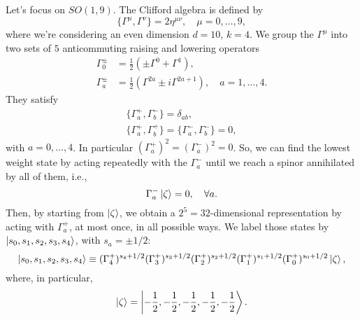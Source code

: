 \begin{mdframed}
Let's focus on $SO(1,9)$. The Clifford algebra is defined by
\begin{equation}\label{eq:clifford}
    \{ \Gamma^\mu, \Gamma^\nu \} = 2 \eta^{\mu\nu} , \quad \mu = 0, \dots, 9,
\end{equation}
where we're considering an even dimension $d = 10$, $k=4$. We group the $\Gamma^\mu$ into two sets of $5$ anticommuting raising and lowering operators
\begin{subequations}
\begin{align}
    \Gamma^\pm_0 &= \frac{1}{2} (\pm \Gamma^0 + \Gamma^1), \label{eq:gamma-zero-pm}\\
    \Gamma^\pm_a &= \frac{1}{2}(\Gamma^{2a} \pm i \Gamma^{2a+1}), \quad a = 1, \dots, 4 .\label{eq:gamma-a-pm}
\end{align}
\end{subequations}
They satisfy
\begin{subequations}\label{eq:md-anticomm}
\begin{gather}
    \{ \Gamma^+_a, \Gamma^-_b \} = \delta_{ab} , \\
    \{ \Gamma^+_a, \Gamma^+_b \} = \{ \Gamma^-_a, \Gamma^-_b \} = 0 ,
\end{gather}
\end{subequations}
with $a = 0, \dots, 4$. In particular $(\Gamma^+_a)^2=(\Gamma^-_a)^2=0$. So, we can find the lowest weight state by acting repeatedly with the $\Gamma^-_a$ until we reach a spinor annihilated by all of them, i.e.,
\begin{equation}
    \Gamma^-_a \ket{\zeta} = 0, \quad \forall a .
\end{equation}
Then, by starting from $\ket{\zeta}$, we obtain a $2^5 = 32$-dimensional representation by acting with $\Gamma^+_a$, at most once, in all possible ways. We label those states by $\ket{s_0,s_1,s_2,s_3,s_4}$, with $s_a = \pm 1/2$:
\begin{equation*}
    \ket{s_0,s_1,s_2,s_3,s_4} \equiv (\Gamma^+_4)^{s_4 + 1/2} (\Gamma^+_3)^{s_3 + 1/2} (\Gamma^+_2)^{s_2 + 1/2} (\Gamma^+_1)^{s_1 + 1/2} (\Gamma^+_0)^{s_0 + 1/2} \ket{\zeta},
\end{equation*}
where, in particular,
\begin{equation}
    \ket{\zeta} = \ket{-\frac{1}{2},-\frac{1}{2},-\frac{1}{2},-\frac{1}{2},-\frac{1}{2}}.
\end{equation}


\end{mdframed}
